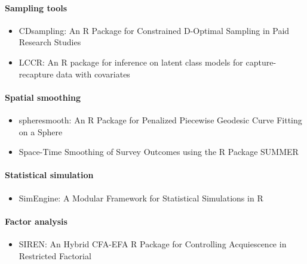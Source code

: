 \paragraph{Sampling tools}\label{sampling-tools}

\begin{itemize}
\tightlist
\item
  CDsampling: An R Package for Constrained D-Optimal Sampling in Paid Research Studies
\item
  LCCR: An R package for inference on latent class models for capture-recapture data with covariates
\end{itemize}

\paragraph{Spatial smoothing}\label{spatial-smoothing}

\begin{itemize}
\tightlist
\item
  spheresmooth: An R Package for Penalized Piecewise Geodesic Curve Fitting on a Sphere
\item
  Space-Time Smoothing of Survey Outcomes using the R Package SUMMER
\end{itemize}

\paragraph{Statistical simulation}\label{statistical-simulation}

\begin{itemize}
\tightlist
\item
  SimEngine: A Modular Framework for Statistical Simulations in R
\end{itemize}

\paragraph{Factor analysis}\label{factor-analysis}

\begin{itemize}
\tightlist
\item
  SIREN: An Hybrid CFA-EFA R Package for Controlling Acquiescence in Restricted Factorial
\end{itemize}


\address{%
Rob J Hyndman\\
Monash University\\%
\\
%
\url{https://journal.r-project.org}\\%
%
\href{mailto:r-journal@r-project.org}{\nolinkurl{r-journal@r-project.org}}%
}
